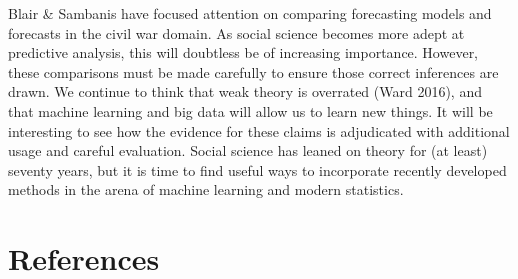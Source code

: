 \documentclass[
]{article}
\begin{document}
Blair \& Sambanis have focused attention on comparing forecasting models and forecasts in the civil war domain. As social science becomes more adept at predictive analysis, this will doubtless be of increasing importance. However, these comparisons must be made carefully to ensure those correct inferences are drawn. We continue to think that weak theory is overrated (Ward 2016), and that machine learning and big data will allow us to learn new things. It will be interesting to see how the evidence for these claims is adjudicated with additional usage and careful evaluation. Social science has leaned on theory for (at least) seventy years, but it is time to find useful ways to incorporate recently developed methods in the arena of machine learning and modern statistics.

\newpage

\hypertarget{references}{%
\section{References}\label{references}}
\end{document}
